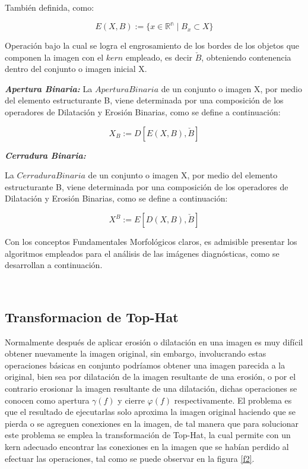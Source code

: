 \documentclass[12pt]{article}
\begin{document}
También definida, como:

\begin{equation}
                E(X,B) := \{ x \in \mathbb{R^n} \mid B_{x} \subset X \}
\end{equation}


\justifying
   Operación bajo la cual se logra el engrosamiento de los bordes de los objetos que componen la imagen con el $kern$ empleado, es decir $\check{B}$, obteniendo contenencia dentro del conjunto o imagen inicial X.
   
\justifying   
\textbf{\textit{Apertura Binaria:}} La $Apertura Binaria$ de un conjunto o imagen X, por medio del elemento estructurante B, viene determinada por una composición de los operadores de Dilatación y Erosión Binarias, como se define a continuación:


\begin{equation}
X_{B} := D[E(X,B),\check{B}]
\end{equation}

\justifying
\textbf{\textit{Cerradura Binaria:}} 

La $Cerradura Binaria$ de un conjunto o imagen X, por medio del elemento estructurante B, viene determinada por una composición de los operadores de Dilatación y Erosión Binarias, como se define a continuación:

\begin{equation}
X^B := E[D(X,B), \check{B}]
\end{equation}

 \justifying
 Con los conceptos Fundamentales Morfológicos claros, es admisible presentar los algoritmos empleados para el análisis de las imágenes diagnósticas, como se desarrollan a continuación.
   
                
\
\justifying
\subsection{\color{Black}Transformacion de Top-Hat}
\justifying

Normalmente después de aplicar erosión o dilatación en una imagen es muy difícil obtener nuevamente la imagen original, sin embargo, involucrando estas operaciones básicas en conjunto podríamos obtener una imagen parecida a la original, bien sea por dilatación de la imagen resultante de una erosión, o por el contrario erosionar la imagen resultante de una dilatación, dichas operaciones se conocen como apertura $\gamma(f)$  y cierre $\varphi(f)$ respectivamente. El problema es que el resultado de ejecutarlas solo aproxima la imagen original haciendo que se pierda o se agreguen conexiones en la imagen, de tal manera que para solucionar este problema se emplea la transformación de Top-Hat, la cual permite con un kern adecuado encontrar las conexiones en la imagen que se habían perdido al efectuar las operaciones, tal como se  puede observar en la figura \ref{f2}.
\end{document}
